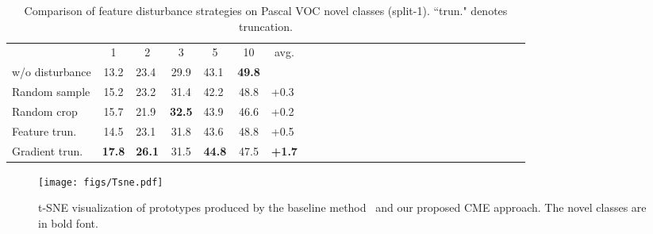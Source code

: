 \documentclass[final]{cvpr}
\begin{document}
\setlength{\tabcolsep}{4pt}
    \begin{table}[t]
    \begin{center}
    \caption{Comparison of feature disturbance strategies on Pascal VOC novel classes (split-1). ``trun." denotes truncation.} 
\label{table:Ab_Disturbance_manner}
    \begin{tabular}{l|clclclclclclclclclclclclcl}
    \hline\noalign{\smallskip}
    \multicolumn{1}{c}{{\diagbox{Manner}{Shots}}} & \multicolumn{1}{c}{{1}} & \multicolumn{1}{c}{{2}} & \multicolumn{1}{c}{{3}} & \multicolumn{1}{c}{{5}} & \multicolumn{1}{c}{{10}} & \multicolumn{1}{c}{{avg. }}\\
    \noalign{\smallskip}
    \hline
    \noalign{\smallskip}
    {w/o disturbance}  & {13.2} & {23.4} & {29.9} & {43.1} & \bf{49.8} & {}\\ 
    {Random sample} & {15.2} & {23.2} & {31.4} & {42.2} & {48.8} & {+0.3}\\ 
    {Random crop} & {15.7} & {21.9} & \bf{32.5} & {43.9} & {46.6} & {+0.2}\\ 
    {Feature trun.} & {14.5} & {23.1} & {31.8} & {43.6} & {48.8} & {+0.5}\\ 
    {Gradient trun.} & \bf{17.8} & \bf{26.1} & {31.5} & \bf{44.8} & {47.5} & \bf{+1.7}\\
    \hline
    \end{tabular}
    \end{center}
    \end{table}
    \setlength{\tabcolsep}{1.4pt}

\begin{figure}[t]
\centering
\texttt{[image: figs/Tsne.pdf]}
\caption{t-SNE visualization of prototypes produced by the baseline method~\cite{FeatureReweighting} and our proposed CME approach. The novel classes are in bold font.}
\label{fig:Tsne}
\vspace{-0.2cm}
\end{figure}
\end{document}
